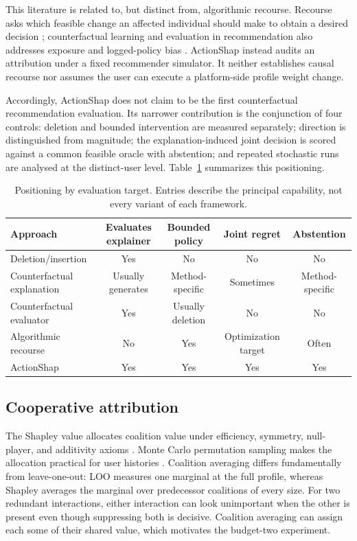 \documentclass[pdflatex,sn-basic]{sn-jnl}
\begin{document}
This literature is related to, but distinct from, algorithmic recourse. Recourse asks which feasible change an affected individual should make to obtain a desired decision \citep{wachter2017,karimi2021}; counterfactual learning and evaluation in recommendation also addresses exposure and logged-policy bias \citep{saito2021}. ActionShap instead audits an attribution under a fixed recommender simulator. It neither establishes causal recourse nor assumes the user can execute a platform-side profile weight change.

Accordingly, ActionShap does not claim to be the first counterfactual recommendation evaluation. Its narrower contribution is the conjunction of four controls: deletion and bounded intervention are measured separately; direction is distinguished from magnitude; the explanation-induced joint decision is scored against a common feasible oracle with abstention; and repeated stochastic runs are analysed at the distinct-user level. Table~\ref{tab:positioning} summarizes this positioning.

\begin{table}[t]
\centering
\small
\caption{Positioning by evaluation target. Entries describe the principal capability, not every variant of each framework.}
\label{tab:positioning}
\begin{tabular}{lcccc}
\toprule
Approach & Evaluates explainer & Bounded policy & Joint regret & Abstention \\
\midrule
Deletion/insertion & Yes & No & No & No \\
Counterfactual explanation & Usually generates & Method-specific & Sometimes & Method-specific \\
Counterfactual evaluator & Yes & Usually deletion & No & No \\
Algorithmic recourse & No & Yes & Optimization target & Often \\
ActionShap & Yes & Yes & Yes & Yes \\
\bottomrule
\end{tabular}
\end{table}

\subsection{Cooperative attribution}
The Shapley value allocates coalition value under efficiency, symmetry, null-player, and additivity axioms \citep{shapley1953}. Monte Carlo permutation sampling makes the allocation practical for user histories \citep{castro2009}. Coalition averaging differs fundamentally from leave-one-out: LOO measures one marginal at the full profile, whereas Shapley averages the marginal over predecessor coalitions of every size. For two redundant interactions, either interaction can look unimportant when the other is present even though suppressing both is decisive. Coalition averaging can assign each some of their shared value, which motivates the budget-two experiment.
\end{document}
